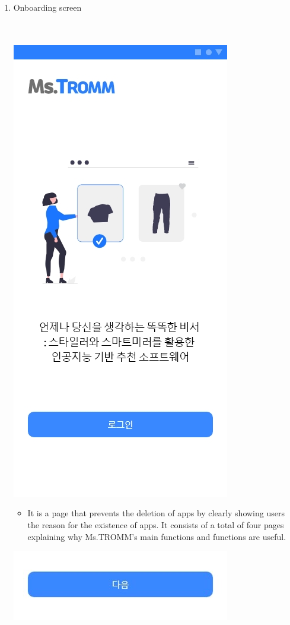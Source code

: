 \documentclass[conference]{IEEEtran}
\begin{document}
\begin{enumerate}
\begin{itemize}
    \end{itemize}
    \item Onboarding screen \\ \\ \\
    \centerline{\includegraphics[scale=0.32]{2. 온보드.jpg}}
    \begin{itemize}
    \item[] It is a page that prevents the deletion of apps by clearly showing users the reason for the existence of apps. It consists of a total of four pages explaining why Ms.TROMM's main functions and functions are useful.\\
    \end{itemize}
    \centerline{\includegraphics[scale=0.7]{2-1. 다음 버튼.jpg}}

\end{enumerate}
\end{document}
